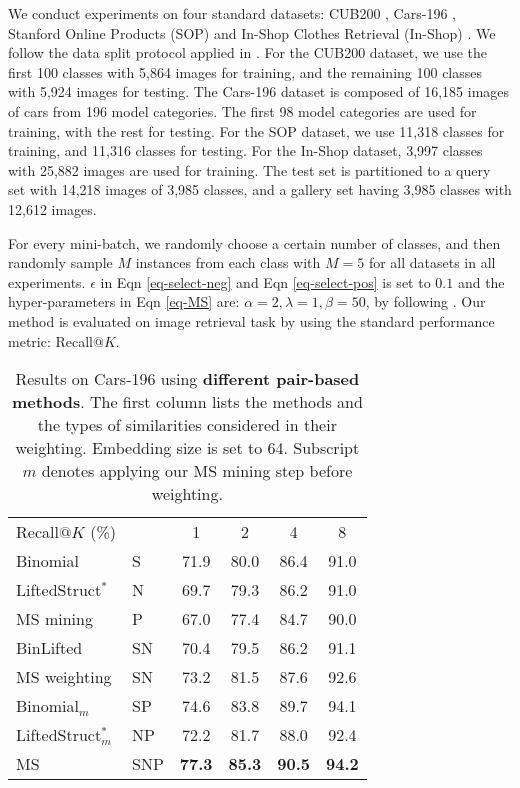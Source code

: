 \documentclass[10pt,twocolumn,letterpaper]{article}
\newcommand{\tablestyle}[2]{\setlength{\tabcolsep}{#1}\renewcommand{\arraystretch}{#2}\centering\footnotesize}
\begin{document}
We conduct experiments on four standard datasets:  CUB200 \cite{CUB_200_2011}, Cars-196 \cite{car-196}, Stanford Online Products (SOP) \cite{lifted-structured-loss} and In-Shop Clothes Retrieval (In-Shop) \cite{DeepFashion}.
We follow the data split protocol applied in \cite{lifted-structured-loss}.
For the CUB200 dataset, we use the first 100 classes
with 5,864 images for training, and the remaining 100 classes with 5,924
images for testing. 
The Cars-196 dataset is composed of 16,185 images of cars from 196 model categories.
The first 98 model categories are used for training, with the rest for testing.
For the SOP dataset, we use 11,318 classes for training, and 11,316 classes for testing. 
For the In-Shop dataset, 3,997 classes with 25,882 images are used for training.
The test set is partitioned to a query set with 14,218 images of 3,985 classes, and a gallery set having  3,985 classes with 12,612 images.

For every mini-batch, we randomly choose a certain number of classes, and then randomly sample $M$ instances from each class with $M = 5$ for all datasets in all experiments. $\epsilon$ in Eqn \ref{eq-select-neg} and Eqn \ref{eq-select-pos} is set to $0.1$  and the hyper-parameters in Eqn \ref{eq-MS} are: $\alpha=2, \lambda=1, \beta=50$, by following \cite{histogram}. 
Our method is evaluated on image retrieval task by using the standard performance metric: Recall$@K$.

\begin{table}[t]
\tablestyle{9pt}{1.1}
	\begin{tabular}{ll|cccc}
		Recall$@K$ (\%) &	  &1 & 2 & 4  & 8\\ \shline
		Binomial	 &S & 71.9& 80.0& 86.4  &91.0    \\  
		LiftedStruct$^*$&N &  69.7&  79.3&  86.2  & 91.0  \\ 
		MS mining		&P  & 67.0& 77.4& 84.7& 90.0\\ \hline
		BinLifted   &SN & 70.4& 79.5& 86.2& 91.1 \\ 
		MS weighting&SN & 73.2& 81.5& 87.6& 92.6 \\ \hline
		Binomial$_{m}$ & SP & 74.6& 83.8& 89.7& 94.1\\
		LiftedStruct$_{m}^{*}$ & NP& 72.2& 81.7& 88.0& 92.4\\ \hline
		MS 		&SNP & \bf 77.3& \bf 85.3& \bf 90.5& \bf 94.2 \\ 
	\end{tabular}
	\vspace{1pt}
	\caption{Results on Cars-196 using \textbf{different pair-based methods}. The first column lists the methods and the types of similarities considered in their weighting. Embedding size is set to 64. Subscript ${m}$ denotes applying our MS mining step before weighting.} 
	\label{tab-ablation}
	\vspace{-10pt}
\end{table}
\end{document}
